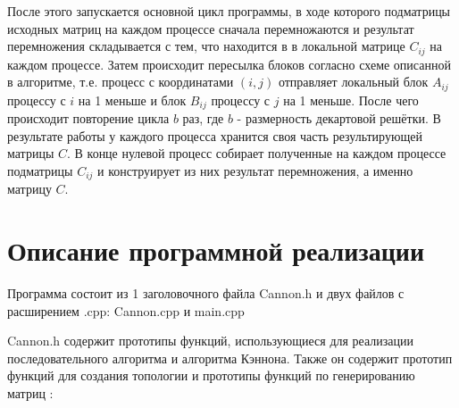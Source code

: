 \documentclass[12pt, letterpaper]{article}
\begin{document}
После этого запускается основной цикл программы, в ходе которого подматрицы исходных матриц на каждом процессе сначала перемножаются и результат перемножения складывается с тем, что находится в в локальной матрице $C_{ij}$ на каждом процессе. Затем происходит пересылка блоков согласно схеме описанной в алгоритме, т.е. процесс с координатами $(i,j)$ отправляет локальный блок $A_{ij}$ процессу с $i$ на 1 меньше и блок $B_{ij}$ процессу с $j$ на 1 меньше. После чего происходит повторение цикла $b$ раз, где $b$ - размерность декартовой решётки. В результате работы у каждого процесса хранится своя часть результирующей матрицы $C$. В конце нулевой процесс собирает полученные на каждом процессе подматрицы $C_{ij}$ и конструирует из них результат перемножения, а именно матрицу $C$.
\newpage

\section*{Описание программной реализации}
Программа состоит из 1 заголовочного файла Cannon.h и двух файлов с расширением .cpp: Cannon.cpp и main.cpp

Cannon.h содержит прототипы функций, использующиеся для реализации последовательного алгоритма и алгоритма Кэннона. Также он содержит прототип функций для создания топологии и прототипы функций по генерированию матриц :
\end{document}
